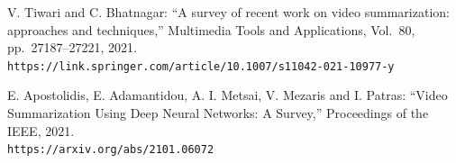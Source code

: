 V. Tiwari and C. Bhatnagar:
``A survey of recent work on video summarization: approaches and techniques,''
Multimedia Tools and Applications, Vol.~80, pp.~27187--27221, 2021.\\
{\tt https://link.springer.com/article/10.1007/s11042-021-10977-y}

E. Apostolidis, E. Adamantidou, A. I. Metsai, V. Mezaris and I. Patras:
``Video Summarization Using Deep Neural Networks: A Survey,''
Proceedings of the IEEE, 2021.\\
{\tt https://arxiv.org/abs/2101.06072}
